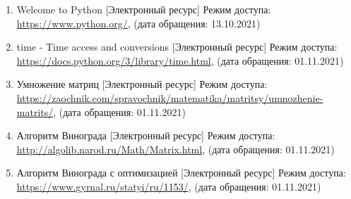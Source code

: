 
\begin{enumerate}
	\item Welcome to Python [Электронный ресурс] Режим доступа: \url{https://www.python.org/}, (дата обращения: 13.10.2021)
	\item time - Time access and conversions [Электронный ресурс] Режим доступа: \url{https://docs.python.org/3/library/time.html}, (дата обращения: 01.11.2021)
	\item Умножение матриц [Электронный ресурс] Режим доступа: \url{https://zaochnik.com/spravochnik/matematika/matritsy/umnozhenie-matrits/}, (дата обращения: 01.11.2021) 		
	\item Алгоритм Винограда [Электронный ресурс] Режим доступа: \url{http://algolib.narod.ru/Math/Matrix.html}, (дата обращения: 01.11.2021)
	\item Алгоритм Винограда с оптимизацией [Электронный ресурс] Режим доступа: \url{https://www.gyrnal.ru/statyi/ru/1153/}, (дата обращения: 01.11.2021)
\end{enumerate}